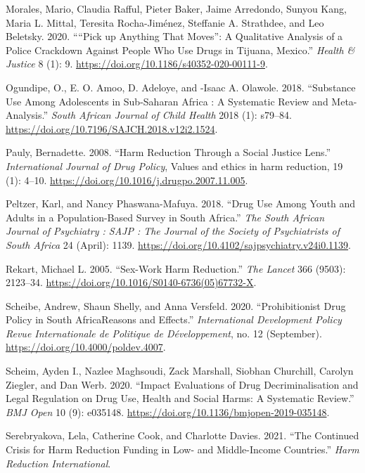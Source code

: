 \documentclass[
  letterpaper,
  DIV=11,
  numbers=noendperiod]{scrartcl}
\newlength{\cslhangindent}
\newenvironment{CSLReferences}[2] %
 {\begin{list}{}{%
  \setlength{\itemindent}{0pt}
  \setlength{\leftmargin}{0pt}
  \setlength{\parsep}{0pt}
  \ifodd #1
   \setlength{\leftmargin}{\cslhangindent}
   \setlength{\itemindent}{-1\cslhangindent}
  \fi
  \setlength{\itemsep}{#2\baselineskip}}}
 {\end{list}}
\begin{document}
\begin{CSLReferences}{1}{0}
Morales, Mario, Claudia Rafful, Pieter Baker, Jaime Arredondo, Sunyou
Kang, Maria L. Mittal, Teresita Rocha-Jiménez, Steffanie A. Strathdee,
and Leo Beletsky. 2020. {``{``}Pick up Anything That Moves{''}: A
Qualitative Analysis of a Police Crackdown Against People Who Use Drugs
in Tijuana, Mexico.''} \emph{Health \& Justice} 8 (1): 9.
\url{https://doi.org/10.1186/s40352-020-00111-9}.

Ogundipe, O., E. O. Amoo, D. Adeloye, and -Isaac A. Olawole. 2018.
{``Substance Use Among Adolescents in Sub-Saharan Africa : A Systematic
Review and Meta-Analysis.''} \emph{South African Journal of Child
Health} 2018 (1): s79--84.
\url{https://doi.org/10.7196/SAJCH.2018.v12i2.1524}.

Pauly, Bernadette. 2008. {``Harm Reduction Through a Social Justice
Lens.''} \emph{International Journal of Drug Policy}, Values and ethics
in harm reduction, 19 (1): 4--10.
\url{https://doi.org/10.1016/j.drugpo.2007.11.005}.

Peltzer, Karl, and Nancy Phaswana-Mafuya. 2018. {``Drug Use Among Youth
and Adults in a Population-Based Survey in South Africa.''} \emph{The
South African Journal of Psychiatry : SAJP : The Journal of the Society
of Psychiatrists of South Africa} 24 (April): 1139.
\url{https://doi.org/10.4102/sajpsychiatry.v24i0.1139}.

Rekart, Michael L. 2005. {``Sex-Work Harm Reduction.''} \emph{The
Lancet} 366 (9503): 2123--34.
\url{https://doi.org/10.1016/S0140-6736(05)67732-X}.

Scheibe, Andrew, Shaun Shelly, and Anna Versfeld. 2020.
{``Prohibitionist Drug Policy in South Africa{\textemdash}Reasons and
Effects.''} \emph{International Development Policy \textbar{} Revue
Internationale de Politique de Développement}, no. 12 (September).
\url{https://doi.org/10.4000/poldev.4007}.

Scheim, Ayden I., Nazlee Maghsoudi, Zack Marshall, Siobhan Churchill,
Carolyn Ziegler, and Dan Werb. 2020. {``Impact Evaluations of Drug
Decriminalisation and Legal Regulation on Drug Use, Health and Social
Harms: A Systematic Review.''} \emph{BMJ Open} 10 (9): e035148.
\url{https://doi.org/10.1136/bmjopen-2019-035148}.

Serebryakova, Lela, Catherine Cook, and Charlotte Davies. 2021. {``The
Continued Crisis for Harm Reduction Funding in Low- and Middle-Income
Countries.''} \emph{Harm Reduction International}.


\end{CSLReferences}
\end{document}
